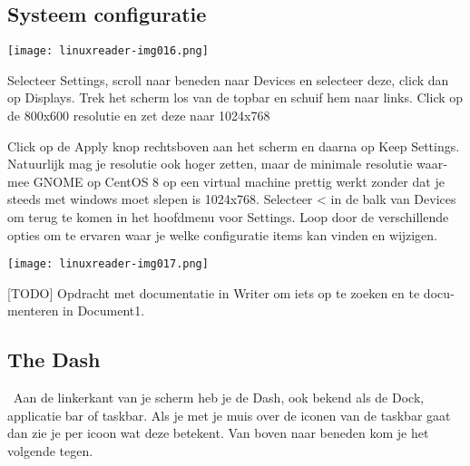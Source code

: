 \subsection[Systeem configuratie]{ Systeem configuratie}
\hypertarget{RefHeadingToc74821786672253}{}



\begin{center}
\texttt{[image: linuxreader-img016.png]}
\end{center}
{
Selecteer Settings, scroll naar beneden naar Devices en selecteer deze, click dan op Displays. Trek het scherm los van
de topbar en schuif hem naar links. Click op de 800x600 resolutie en zet deze naar 1024x768}

{
\foreignlanguage{dutch}{Click op de Apply knop rechtsboven aan het scherm en daarna op Keep Settings. Natuurlijk mag je
resolutie ook hoger zetten, maar de minimale resolutie waarmee GNOME op CentOS 8 op een virtual machine prettig werkt
zonder dat je steeds met windows moet slepen is 1024x768. Selecteer {\textless} in de balk van Devices om terug te
komen in het hoofdmenu voor Settings. Loop door de verschillende opties om te ervaren waar je welke configuratie items
kan vinden en wijzigen.}}

\begin{center}
\texttt{[image: linuxreader-img017.png]}
\end{center}
{
\foreignlanguage{dutch}{[TODO] Opdracht met documentatie in Writer om iets op te zoeken en te documenteren in Document1.
}}


\bigskip

\subsection{The Dash}
\hypertarget{RefHeadingToc21382520829451}{}{
\ Aan de linkerkant van je scherm heb je de Dash, ook bekend als de Dock, applicatie bar of taskbar. Als je met je muis
over de iconen van de taskbar gaat dan zie je per icoon wat deze betekent. Van boven naar beneden kom je het volgende
tegen.}

